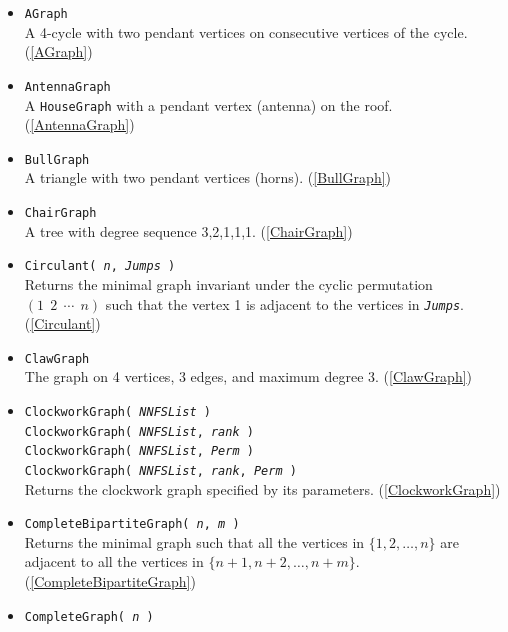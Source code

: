\documentclass[a4paper,11pt]{report}
\begin{document}
{{\begin{itemize}
\item \texttt{AGraph}\\
 A 4-cycle with two pendant vertices on consecutive vertices of the cycle. (\ref{AGraph}) 
\item \texttt{AntennaGraph}\\
 A \texttt{HouseGraph} with a pendant vertex (antenna) on the roof. (\ref{AntennaGraph}) 
\item \texttt{BullGraph}\\
 A triangle with two pendant vertices (horns). (\ref{BullGraph}) 
\item \texttt{ChairGraph}\\
 A tree with degree sequence 3,2,1,1,1. (\ref{ChairGraph}) 
\item \texttt{Circulant( \mbox{\texttt{\mdseries\slshape n}}, \mbox{\texttt{\mdseries\slshape Jumps}} )}\\
 Returns the minimal graph invariant under the cyclic permutation $(1\;\,2\;\,\cdots\;\,n)$ such that the vertex 1 is adjacent to the vertices in \mbox{\texttt{\mdseries\slshape Jumps}}. (\ref{Circulant}) 
\item \texttt{ClawGraph}\\
 The graph on 4 vertices, 3 edges, and maximum degree 3. (\ref{ClawGraph}) 
\item \texttt{ClockworkGraph( \mbox{\texttt{\mdseries\slshape NNFSList}} )}\\
 \texttt{ClockworkGraph( \mbox{\texttt{\mdseries\slshape NNFSList}}, \mbox{\texttt{\mdseries\slshape rank}} )}\\
 \texttt{ClockworkGraph( \mbox{\texttt{\mdseries\slshape NNFSList}}, \mbox{\texttt{\mdseries\slshape Perm}} )}\\
 \texttt{ClockworkGraph( \mbox{\texttt{\mdseries\slshape NNFSList}}, \mbox{\texttt{\mdseries\slshape rank}}, \mbox{\texttt{\mdseries\slshape Perm}} )}\\
 Returns the clockwork graph specified by its parameters. (\ref{ClockworkGraph}) 
\item \texttt{CompleteBipartiteGraph( \mbox{\texttt{\mdseries\slshape n}}, \mbox{\texttt{\mdseries\slshape m}} )}\\
 Returns the minimal graph such that all the vertices in $\{1, 2, \ldots, n\}$ are adjacent to all the vertices in $\{n+1,n+2,\ldots, n+m\}$. (\ref{CompleteBipartiteGraph}) 
\item \texttt{CompleteGraph( \mbox{\texttt{\mdseries\slshape n}} )}\\

\end{itemize}}}
\end{document}
